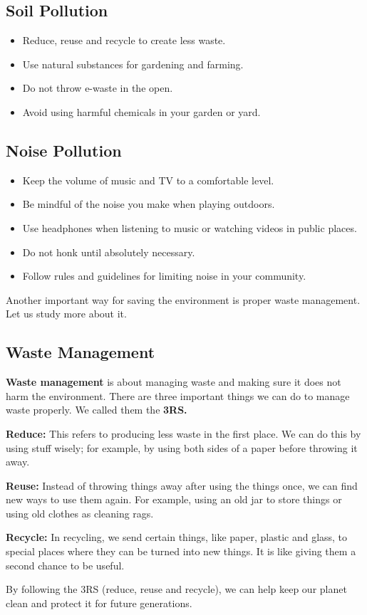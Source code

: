\subsection{Soil Pollution}
\begin{itemize}
    \item Reduce, reuse and recycle to create less waste.
    \item Use natural substances for gardening and farming.
    \item Do not throw e-waste in the open.
    \item Avoid using harmful chemicals in your garden or yard.
\end{itemize}
\subsection{Noise Pollution}
\begin{itemize}
    \item Keep the volume of music and TV to a comfortable level.
    \item Be mindful of the noise you make when playing outdoors.
    \item Use headphones when listening to music or watching videos in public places.
    \item Do not honk until absolutely necessary.
    \item Follow rules and guidelines for limiting noise in your community.
\end{itemize}
Another important way for saving the environment is proper waste management. Let us study more about it.
\subsection{Waste Management}
\textbf{Waste management} is about managing waste and making sure it does not harm the environment. There are three important things we can do to manage waste properly. We called them the \textbf{3RS.}
\vspace{0.1in}
\par
\textbf{Reduce:} This refers to producing less waste in the first place. We can do this by using stuff wisely; for example, by using both sides of a paper before throwing it away.
\vspace{0.1in}
\par
\textbf{Reuse:} Instead of throwing things away after using  the things once, we can find new ways to use them again. For example, using an old jar to store things or using old clothes as cleaning rags.
\vspace{0.1in}
\par
\textbf{Recycle:} In recycling, we send certain things, like paper, plastic and glass, to special places where they can be turned into new things. It is like giving them a second chance to be useful.
\vspace{0.1in}
\par
By following the 3RS (reduce, reuse and recycle), we can help keep our planet clean and protect it for future generations.
\vspace{3.2in}
